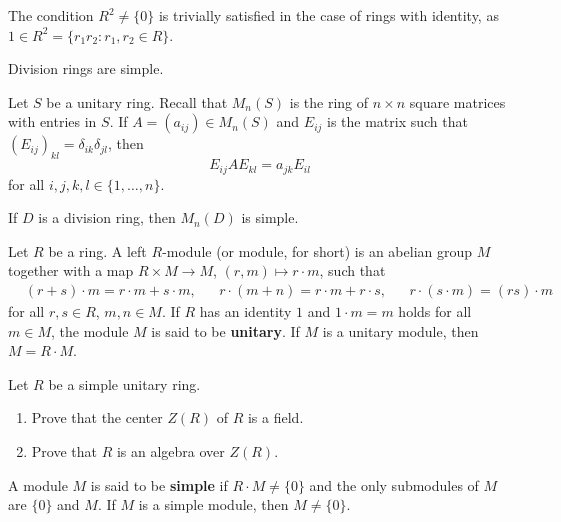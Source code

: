 The condition $R^2\ne\{0\}$ is trivially satisfied in the case of rings
with identity, as $1\in R^2=\{r_1r_2:r_1,r_2\in R\}$.

\begin{example}
	Division rings are simple.
\end{example}

Let $S$ be a unitary ring. Recall that $M_n(S)$ is the ring of $n\times n$ square matrices 
with entries in $S$.  If $A=(a_{ij})\in M_n(S)$ and $E_{ij}$ is the matrix
such that $(E_{ij})_{kl}=\delta_{ik}\delta_{jl}$, then
\begin{equation}
	\label{eq:trick}
E_{ij}AE_{kl}=a_{jk}E_{il}
\end{equation}
for all $i,j,k,l\in\{1,\dots,n\}$. 

\begin{example}
	If $D$ is a division ring, then $M_n(D)$ is simple. 
\end{example}

Let $R$ be a ring. A left $R$-module (or module, for short)  
is an abelian group $M$ together with a map $R\times M\to M$, $(r,m)\mapsto r\cdot m$, such that
\begin{align*}
	&(r+s)\cdot m=r\cdot m+s\cdot m, &&
	r\cdot (m+n)=r\cdot m+r\cdot s, && r\cdot (s\cdot m)=(rs)\cdot m    
\end{align*}
for all $r,s\in R$, $m,n\in M$.  If $R$ has an identity 
$1$ and $1\cdot m=m$ holds for all $m\in M$, the module $M$ is said to be 
\textbf{unitary}.  If $M$ is a unitary module, then $M=R\cdot M$. %

\begin{exercise}
\label{xca:center_simple}
Let $R$ be a simple unitary ring. 
\begin{enumerate}
    \item Prove that the center $Z(R)$ of $R$ is a field.
    \item Prove that $R$ is an algebra over $Z(R)$. 
\end{enumerate}
\end{exercise}


\begin{definition}
\label{Module!simple}
    A module $M$ is said to be 
    \textbf{simple} if $R\cdot M\ne\{0\}$ and 
    the only submodules of $M$ are $\{0\}$ and $M$.
    If $M$ is a simple module, then $M\ne\{0\}$.
\end{definition}

